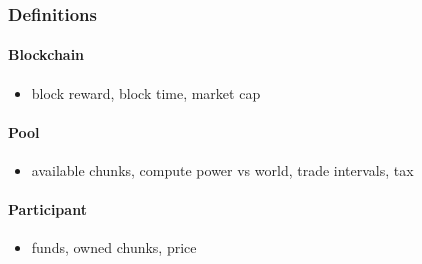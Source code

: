 \subsubsection{Definitions}

\paragraph{Blockchain}

\begin{itemize}
  \item block reward, block time, market cap
\end{itemize}

\paragraph{Pool}

\begin{itemize}
  \item available chunks, compute power vs world, trade intervals, tax
\end{itemize}

\paragraph{Participant}

\begin{itemize}
  \item funds, owned chunks, price
\end{itemize}